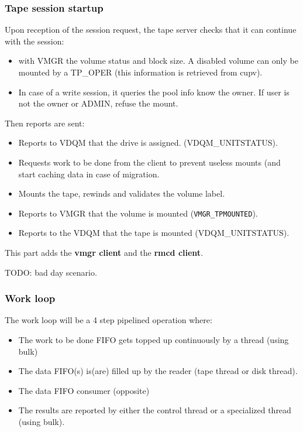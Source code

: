\subsubsection{Tape session startup}

Upon reception of the session request, the tape server checks that it can continue with the session:
\begin{itemize}
\item{}with VMGR the volume status and block size. A disabled volume can only be mounted by a TP\_OPER (this information is retrieved from cupv).
\item{}In case of a write session, it queries the pool info know the owner. If user is not the owner or ADMIN, refuse the mount.
\end{itemize}

Then reports are sent:
\begin{itemize}
\item{}Reports to VDQM that the drive is assigned. (VDQM\_UNITSTATUS).
\item{}Requests work to be done from the client to prevent useless mounts (and start caching data 
in case of migration.
\item{}Mounts the tape, rewinds and validates the volume label.
\item{}Reports to VMGR that the volume is mounted (\verb#VMGR_TPMOUNTED#).
\item{}Reports to the VDQM that the tape is mounted (VDQM\_UNITSTATUS).
\end{itemize}

This part adds the {\bf{}vmgr client} and the {\bf{}rmcd client}.

TODO: bad day scenario.

\subsubsection{Work loop}
The work loop will be a 4 step pipelined operation where:
\begin{itemize}
\item{}The work to be done FIFO gets topped up continuously  by a thread (using bulk)
\item{}The data FIFO(s) is(are) filled up by the reader (tape thread or disk thread).
\item{}The data FIFO consumer (opposite)
\item{}The results are reported by either the control thread or a specialized thread (using bulk).
\end{itemize}

